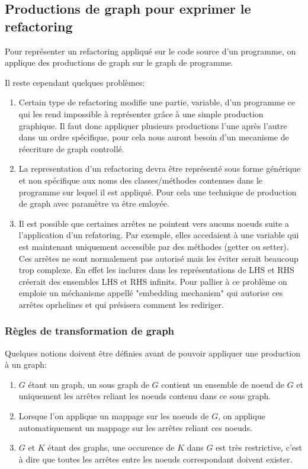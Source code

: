 \documentclass[a4paper, 12pt]{article}
\begin{document}
\subsection{Productions de graph pour exprimer le refactoring}

Pour représenter un refactoring appliqué sur le code source d'un programme, on applique des productions de graph sur le graph de programme.

Il reste cependant quelques problèmes:

\begin{enumerate}
\item Certain type de refactoring modifie une partie, variable, d'un programme ce qui les rend impossible à représenter grâce à une simple production graphique. Il faut donc appliquer plusieurs productions l'une après l'autre dans un ordre spécifique, pour cela nous auront besoin d'un mecanisme de réecriture de graph controllé.

\item La representation d'un refactoring devra être représenté sous forme générique et non spécifique aux noms des classes/méthodes contenues dans le programme sur lequel il est appliqué. Pour cela une technique de production de graph avec paramètre va être emloyée. 

\item Il est possible que certaines arrêtes ne pointent vers aucuns noeuds suite a l'application d'un refatoring. Par exemple, elles accedaient à une variable qui est maintenant uniquement accessible par des méthodes (getter ou setter). Ces arrêtes ne sont normalement pas autorisé mais les éviter serait beaucoup trop complexe. En effet les inclures dans les représentations de LHS et RHS créerait des ensembles LHS et RHS infinits. Pour pallier à ce problème on emploie un méchanisme appellé "embedding mechanism" qui autorise ces arrêtes oprhelines et qui présisera comment les rediriger.
\end{enumerate}

\subsubsection{Règles de transformation de graph}

Quelques notions doivent être définies avant de pouvoir appliquer une production à un graph:

\begin{enumerate}
\item \(G\) étant un graph, un sous graph de \(G\) contient un ensemble de noeud de \(G\) et uniquement les arrêtes reliant les noeuds contenu dans ce sous graph. 

\item Lorsque l'on applique un mappage sur les noeuds de \(G\), on applique automatiquement un mappage sur les arrêtes reliant ces noeuds.

\item \(G\) et \(K\) étant des graphs, une occurence de \(K\) dans \(G\) est très restrictive, c'est à dire que toutes les arrêtes entre les noeuds correspondant doivent exister. 
\end{enumerate}
\end{document}
